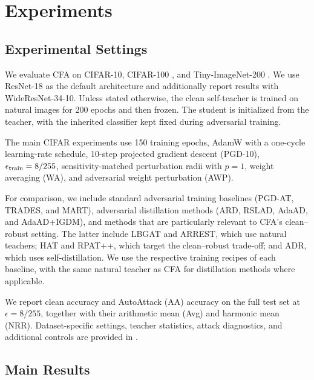 \documentclass{article} %
\theoremstyle{plain}
\begin{document}
\section{Experiments}
\label{sec:exp}

\subsection{Experimental Settings}

We evaluate CFA on CIFAR-10, CIFAR-100
\citep{krizhevsky2009learning}, and Tiny-ImageNet-200
\citep{le2015tiny}. We use ResNet-18 as the default architecture and
additionally report results with WideResNet-34-10. Unless stated otherwise,
the clean self-teacher is trained on natural images for 200 epochs and then
frozen. The student is initialized from the teacher, with the inherited
classifier kept fixed during adversarial training.

The main CIFAR experiments use 150 training epochs, AdamW with a one-cycle
learning-rate schedule, 10-step projected gradient descent (PGD-10),
\(\epsilon_{\rm train}=8/255\), sensitivity-matched perturbation radii with
\(p=1\), weight averaging (WA), and adversarial weight perturbation (AWP).

For comparison, we include standard adversarial training baselines
(PGD-AT, TRADES, and MART), adversarial distillation methods
(ARD, RSLAD, AdaAD, and AdaAD+IGDM), and methods that are particularly
relevant to CFA's clean--robust setting. The latter include LBGAT and
ARREST, which use natural teachers; HAT and RPAT++, which target the
clean--robust trade-off; and ADR, which uses self-distillation. We use
the respective training recipes of each baseline, with the same natural
teacher as CFA for distillation methods where applicable.

We report clean accuracy and AutoAttack (AA) accuracy on the full test set
at \(\epsilon=8/255\), together with their arithmetic mean (Avg) and
harmonic mean (NRR). Dataset-specific settings, teacher statistics, attack
diagnostics, and additional controls are provided in
.


\subsection{Main Results}
\end{document}
